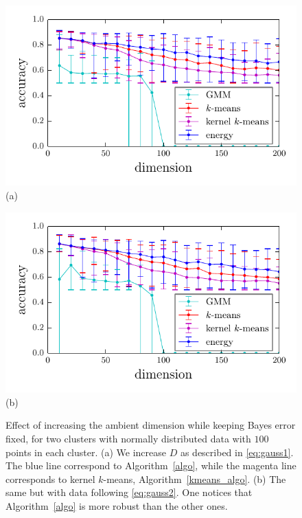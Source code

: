 \documentclass[aps,preprint,nofootinbib,floatfix]{revtex4-1}
\begin{document}
\begin{figure}
\begin{minipage}{0.49\textwidth}
\centering
\includegraphics[width=1\textwidth]{gauss_dim.pdf}\\[-1.0em]
(a)
\end{minipage}
\begin{minipage}{0.49\textwidth}
\centering
\includegraphics[width=1\textwidth]{gauss_cov.pdf}\\[-1.0em]
(b)
\end{minipage}
\caption{
\label{fig:gauss}
Effect of increasing the
ambient dimension while keeping Bayes error fixed, for 
two clusters with normally distributed data with $100$ points in each
cluster. 
(a) 
We increase $D$ as described in \eqref{eq:gauss1}. The blue
line correspond to Algorithm~\ref{algo}, while
the magenta line 
corresponds to kernel $k$-means, Algorithm~\ref{kmeans_algo}.
(b) The same but with data following \eqref{eq:gauss2}.
One notices that
Algorithm~\ref{algo} is more robust than the other ones.
}
\end{figure}
\end{document}
